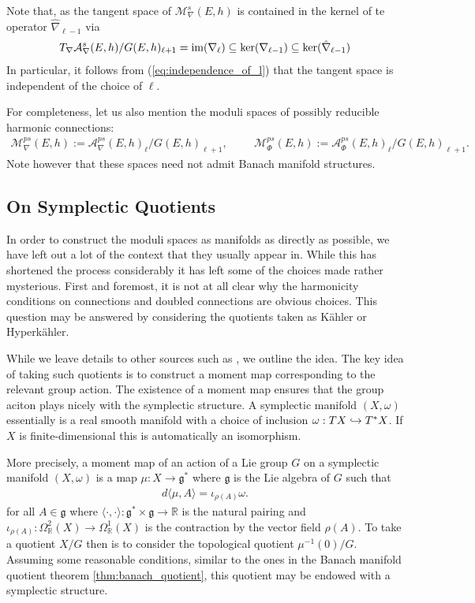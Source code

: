 \documentclass[12pt]{ociamthesis}  %
\begin{document}
Note that, as the tangent space of $\mathcal M^s_\nabla(E,h)$ is
contained in the kernel of te operator $\hat\nabla_{\ell-1}$ via
\begin{align*}
  T_\nabla \mathcal A^s_\nabla(E,h)/G(E,h)_{\ell+1}
  = \operatorname{im}(\nabla_\ell) \subseteq \ker(\nabla_{\ell-1})
  \subseteq \ker(\hat\nabla_{\ell-1})
\end{align*}
In particular, it follows from (\ref{eq:independence_of_l}) that
the tangent space is independent of the choice of $\ell$.

For completeness, let us also mention the moduli spaces of
possibly reducible harmonic connections:
\begin{align*}
  \mathcal M^{ps}_\nabla(E,h) := \mathcal A^{ps}_\nabla(E,h)_\ell/G(E,h)_{\ell + 1}, \hspace{1cm}
  \mathcal M^{ps}_\Phi(E,h) := \mathcal A^{ps}_\Phi(E,h)_\ell/G(E,h)_{\ell + 1}.
\end{align*}
Note however that these spaces need not admit Banach manifold structures.

\subsection{On Symplectic Quotients}

In order to construct the moduli spaces as manifolds as directly as
possible, we have left out a lot of the context that they usually appear
in. While this has shortened the process considerably it has left
some of the choices made rather mysterious. First and foremost, it is
not at all clear why the harmonicity conditions on connections and
doubled connections are obvious choices. This question may be
answered by considering the quotients taken as K\"ahler or Hyperk\"ahler.

While we leave details to other sources such as \missingcitation,
we outline the idea. The key idea of taking such quotients is to
construct a moment map corresponding to the relevant group action.
The existence of a moment map ensures that the group aciton plays nicely
with the symplectic structure. A symplectic manifold $(X,\omega)$
essentially is a real smooth manifold with a choice of inclusion
$\omega : TX \hookrightarrow T^*X$. If $X$ is finite-dimensional this is
automatically an isomorphism.

More precisely, a moment map of an action of a Lie group $G$ on a symplectic manifold
$(X,\omega)$ is a map $\mu : X \to \mathfrak g^*$
where $\mathfrak g$ is the Lie algebra of $G$ such that 
\begin{align*}
  d\langle\mu,A\rangle = \iota_{\rho(A)}\omega.
\end{align*}
for all $A\in\mathfrak g$ where $\langle \cdot,\cdot\rangle : \mathfrak g^* \times \mathfrak g \to \mathbb R$
is the natural pairing and $\iota_{\rho(A)} : \Omega^2_{\mathbb R}(X)\to \Omega^1_{\mathbb R}(X)$
is the contraction by the vector field $\rho(A)$. To take a
quotient $X/G$ then is to consider the topological quotient $\mu^{-1}(0)/G$.
Assuming some reasonable conditions, similar to the ones 
in the Banach manifold quotient theorem \ref{thm:banach_quotient},
this quotient may be endowed with a symplectic structure.
\end{document}

